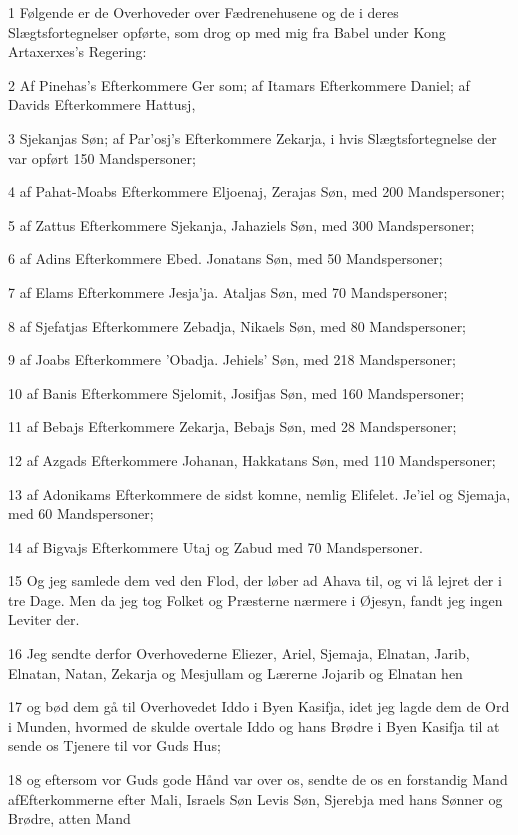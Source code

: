 \par 1 Følgende er de Overhoveder over Fædrenehusene og de i deres Slægtsfortegnelser opførte, som drog op med mig fra Babel under Kong Artaxerxes's Regering:
\par 2 Af Pinehas's Efterkommere Ger som; af Itamars Efterkommere Daniel; af Davids Efterkommere Hattusj,
\par 3 Sjekanjas Søn; af Par'osj's Efterkommere Zekarja, i hvis Slægtsfortegnelse der var opført 150 Mandspersoner;
\par 4 af Pahat-Moabs Efterkommere Eljoenaj, Zerajas Søn, med 200 Mandspersoner;
\par 5 af Zattus Efterkommere Sjekanja, Jahaziels Søn, med 300 Mandspersoner;
\par 6 af Adins Efterkommere Ebed. Jonatans Søn, med 50 Mandspersoner;
\par 7 af Elams Efterkommere Jesja'ja. Ataljas Søn, med 70 Mandspersoner;
\par 8 af Sjefatjas Efterkommere Zebadja, Nikaels Søn, med 80 Mandspersoner;
\par 9 af Joabs Efterkommere 'Obadja. Jehiels' Søn, med 218 Mandspersoner;
\par 10 af Banis Efterkommere Sjelomit, Josifjas Søn, med 160 Mandspersoner;
\par 11 af Bebajs Efterkommere Zekarja, Bebajs Søn, med 28 Mandspersoner;
\par 12 af Azgads Efterkommere Johanan, Hakkatans Søn, med 110 Mandspersoner;
\par 13 af Adonikams Efterkommere de sidst komne, nemlig Elifelet. Je'iel og Sjemaja, med 60 Mandspersoner;
\par 14 af Bigvajs Efterkommere Utaj og Zabud med 70 Mandspersoner.
\par 15 Og jeg samlede dem ved den Flod, der løber ad Ahava til, og vi lå lejret der i tre Dage. Men da jeg tog Folket og Præsterne nærmere i Øjesyn, fandt jeg ingen Leviter der.
\par 16 Jeg sendte derfor Overhovederne Eliezer, Ariel, Sjemaja, Elnatan, Jarib, Elnatan, Natan, Zekarja og Mesjullam og Lærerne Jojarib og Elnatan hen
\par 17 og bød dem gå til Overhovedet Iddo i Byen Kasifja, idet jeg lagde dem de Ord i Munden, hvormed de skulde overtale Iddo og hans Brødre i Byen Kasifja til at sende os Tjenere til vor Guds Hus;
\par 18 og eftersom vor Guds gode Hånd var over os, sendte de os en forstandig Mand afEfterkommerne efter Mali, Israels Søn Levis Søn, Sjerebja med hans Sønner og Brødre, atten Mand
